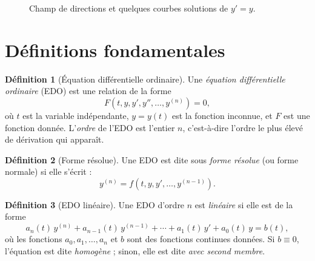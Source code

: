 \documentclass[12pt,a4paper,openany]{book}
\theoremstyle{definition}
\newtheorem{definition}{Définition}[chapter]
\theoremstyle{plain}
\theoremstyle{remark}
\begin{document}
\begin{figure}[ht]
\centering
{}
\caption{Champ de directions et quelques courbes solutions de $y' = y$.}
\label{fig:champ-yp-y}
\end{figure}

\section{Définitions fondamentales}
\label{sec:definitions-fondamentales}

\begin{definition}[Équation différentielle ordinaire]
\label{def:edo}
Une \emph{équation différentielle ordinaire} (EDO) est une relation de la forme
\[
F\!\left(t, y, y', y'', \ldots, y^{(n)}\right) = 0,
\]
où $t$ est la variable indépendante, $y = y(t)$ est la fonction inconnue, et $F$ est une fonction donnée. L'\emph{ordre} de l'EDO est l'entier $n$, c'est-à-dire l'ordre le plus élevé de dérivation qui apparaît.
\end{definition}

\begin{definition}[Forme résolue]
\label{def:forme-resolue}
Une EDO est dite sous \emph{forme résolue} (ou forme normale) si elle s'écrit :
\[
y^{(n)} = f\!\left(t, y, y', \ldots, y^{(n-1)}\right).
\]
\end{definition}

\begin{definition}[EDO linéaire]
\label{def:edo-lineaire}
Une EDO d'ordre $n$ est \emph{linéaire} si elle est de la forme
\[
a_n(t)\,y^{(n)} + a_{n-1}(t)\,y^{(n-1)} + \cdots + a_1(t)\,y' + a_0(t)\,y = b(t),
\]
où les fonctions $a_0, a_1, \ldots, a_n$ et $b$ sont des fonctions continues données. Si $b \equiv 0$, l'équation est dite \emph{homogène} ; sinon, elle est dite \emph{avec second membre}.
\end{definition}
\end{document}
